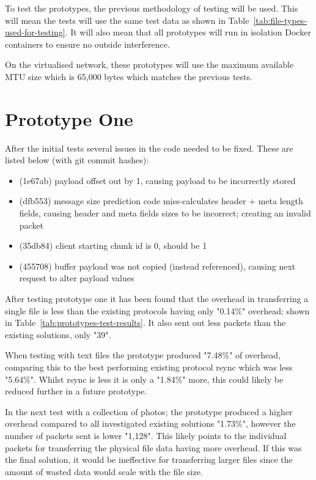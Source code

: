 To test the prototypes, the previous methodology of testing will be used. This will mean the tests will use the same test data as shown in Table~\ref{tab:file-types-used-for-testing}. It will also mean that all prototypes will run in isolation Docker containers to ensure no outside interference.

On the virtualised network, these prototypes will use the maximum available MTU size which is 65,000 bytes which matches the previous tests.

\section{Prototype One}
After the initial tests several issues in the code needed to be fixed. These are listed below (with git commit hashes):

\begin{itemize}
    \item (1e67ab) payload offset out by 1, causing payload to be incorrectly stored
    \item (dfb553) message size prediction code miss-calculates header + meta length fields, causing header and meta fields sizes to be incorrect; creating an invalid packet
    \item (35db84) client starting chunk id is 0, should be 1
    \item (455708) buffer payload was not copied (instead referenced), causing next request to alter payload values
\end{itemize}

After testing prototype one it has been found that the overhead in transferring a single file is less than the existing protocols having only "0.14\%" overhead; shown in Table~\ref{tab:prototypes-test-results}. It also sent out less packets than the existing solutions, only "39".

When testing with text files the prototype produced "7.48\%" of overhead, comparing this to the best performing existing protocol rsync which was less "5.64\%". Whilst rsync is less it is only a
"1.84\%" more, this could likely be reduced further in a future prototype.

In the next test with a collection of photos; the prototype produced a higher overhead compared to all investigated existing solutions "1.73\%", however the number of packets sent is lower "1,128". This likely points to the individual packets for transferring the physical file data having more overhead. If this was the final solution, it would be ineffective for transferring larger files since the amount of wasted data would scale with the file size.

